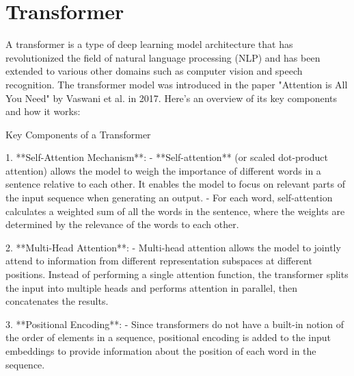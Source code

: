 


\chapter{Transformer}

A transformer is a type of deep learning model architecture that has revolutionized the field of natural language processing (NLP) and has been extended to various other domains such as computer vision and speech recognition. The transformer model was introduced in the paper "Attention is All You Need" by Vaswani et al. in 2017. Here's an overview of its key components and how it works:

 Key Components of a Transformer

1. **Self-Attention Mechanism**:
   - **Self-attention** (or scaled dot-product attention) allows the model to weigh the importance of different words in a sentence relative to each other. It enables the model to focus on relevant parts of the input sequence when generating an output.
   - For each word, self-attention calculates a weighted sum of all the words in the sentence, where the weights are determined by the relevance of the words to each other.

2. **Multi-Head Attention**:
   - Multi-head attention allows the model to jointly attend to information from different representation subspaces at different positions. Instead of performing a single attention function, the transformer splits the input into multiple heads and performs attention in parallel, then concatenates the results.

3. **Positional Encoding**:
   - Since transformers do not have a built-in notion of the order of elements in a sequence, positional encoding is added to the input embeddings to provide information about the position of each word in the sequence.

